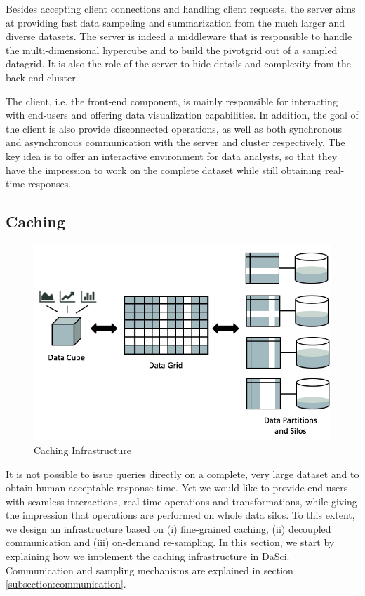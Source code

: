 \documentclass[10pt, a4paper, twocolumn]{article} %
\begin{document}
Besides accepting client connections and handling client requests, the server aims at providing fast data sampeling and summarization from the much larger and diverse datasets. The server is indeed a middleware that is responsible to handle the multi-dimensional hypercube and to build the pivotgrid out of a sampled datagrid. It is also the role of the server to hide details and complexity from the back-end cluster.

The client, i.e. the front-end component, is mainly responsible for interacting with end-users and offering data visualization capabilities. In addition, the goal of the client is also provide disconnected operations, as well as both synchronous and asynchronous communication with the server and cluster respectively.
The key idea is to offer an interactive environment for data analysts, so that they have the impression to work on the complete dataset while still obtaining real-time responses.


\subsection{Caching}

\begin{figure}
	\centering
	\includegraphics[scale=0.3]{images/caching.png}
	\caption{Caching Infrastructure}
	\label{figure:caching}
\end{figure}

It is not possible to issue queries directly on a complete, very large dataset and to obtain human-acceptable response time. Yet we would like to provide end-users with seamless interactions, real-time operations and transformations, while giving the impression that operations are performed on whole data silos. 
To this extent, we design an infrastructure based on (i) fine-grained caching, (ii) decoupled communication and (iii) on-demand re-sampling.
In this section, we start by explaining how we implement the caching infrastructure in DaSci.
Communication and sampling mechanisms are explained in section \ref{subsection:communication}.
\end{document}
